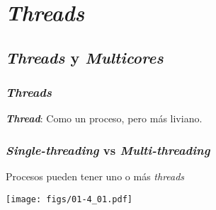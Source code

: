 \documentclass[letter]{beamer}
\begin{document}
\section{{\em Threads}}

\subsection{{\em Threads} y {\em Multicores}}

\begin{frame}
  \frametitle{{\em Threads}}

  {\em {\bf Thread}}: Como un proceso, pero más liviano.
  
  
  
   
  
\end{frame}

\begin{frame}
  \frametitle{ {\em Single-threading} vs {\em Multi-threading}}
  
  Procesos pueden tener uno o más {\em threads}
  
  \begin{center}
    \texttt{[image: figs/01-4\_01.pdf]}
  \end{center}  
  
\end{frame}
\end{document}
